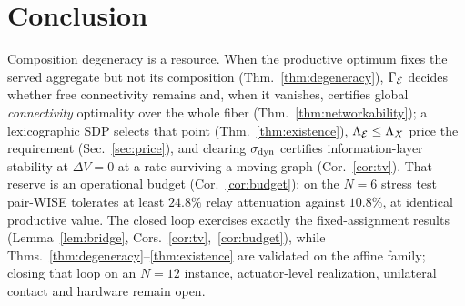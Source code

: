 \section{Conclusion}
\label{sec:conclusion}

Composition degeneracy is a resource. When the productive optimum fixes the served aggregate
but not its composition (Thm.~\ref{thm:degeneracy}), $\Gamma_{\mathcal{E}}$ decides whether free
connectivity remains and, when it vanishes, certifies global \emph{connectivity} optimality
over the whole fiber (Thm.~\ref{thm:networkability}); a lexicographic SDP selects that point
(Thm.~\ref{thm:existence}), $\Lambda_{\mathcal{E}}\le\Lambda_{X}$ price the requirement (Sec.~\ref{sec:price}), and
clearing $\sigma_{\mathrm{dyn}}$ certifies information-layer stability at $\Delta V=0$ at a rate surviving
a moving graph (Cor.~\ref{cor:tv}). That reserve is an operational budget
(Cor.~\ref{cor:budget}): on the $N{=}6$ stress test pair-WISE tolerates at least $24.8\%$ relay
attenuation against $10.8\%$, at identical productive value. The closed loop exercises exactly
the fixed-assignment results (Lemma~\ref{lem:bridge}, Cors.~\ref{cor:tv},~\ref{cor:budget}),
while Thms.~\ref{thm:degeneracy}--\ref{thm:existence} are validated on the affine family;
closing that loop on an $N{=}12$ instance, actuator-level realization, unilateral contact and
hardware remain open.
